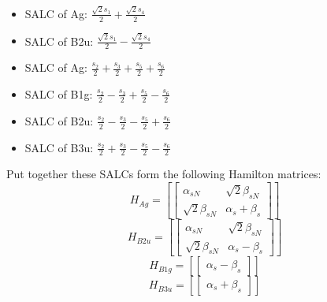 \documentclass[12pt,a4paper]{article}
\begin{document}
\begin{itemize}
\item SALC of Ag: \quad $\frac{\sqrt{2} s_{1}}{2} + \frac{\sqrt{2} s_{4}}{2}$
\item SALC of B2u: \quad $\frac{\sqrt{2} s_{1}}{2} - \frac{\sqrt{2} s_{4}}{2}$
\item SALC of Ag: \quad $\frac{s_{2}}{2} + \frac{s_{3}}{2} + \frac{s_{5}}{2} + \frac{s_{6}}{2}$
\item SALC of B1g: \quad $\frac{s_{2}}{2} - \frac{s_{3}}{2} + \frac{s_{5}}{2} - \frac{s_{6}}{2}$
\item SALC of B2u: \quad $\frac{s_{2}}{2} - \frac{s_{3}}{2} - \frac{s_{5}}{2} + \frac{s_{6}}{2}$
\item SALC of B3u: \quad $\frac{s_{2}}{2} + \frac{s_{3}}{2} - \frac{s_{5}}{2} - \frac{s_{6}}{2}$
\end{itemize}
Put together these SALCs form the following Hamilton matrices:
     $$ H_{Ag}= \left[\begin{bmatrix}\alpha_{s N} & \sqrt{2} \beta_{s N}\\\sqrt{2} \beta_{s N} & \alpha_{s} + \beta_{s}\end{bmatrix}\right]$$ 
     $$ H_{B2u}= \left[\begin{bmatrix}\alpha_{s N} & \sqrt{2} \beta_{s N}\\\sqrt{2} \beta_{s N} & \alpha_{s} - \beta_{s}\end{bmatrix}\right]$$ 
     $$ H_{B1g}= \left[\begin{bmatrix}\alpha_{s} - \beta_{s}\end{bmatrix}\right]$$ 
     $$ H_{B3u}= \left[\begin{bmatrix}\alpha_{s} + \beta_{s}\end{bmatrix}\right]$$ 
\end{document}
